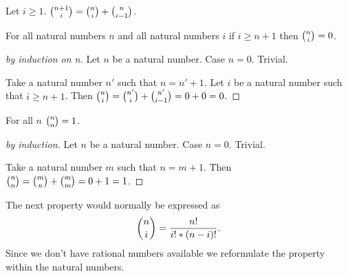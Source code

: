 \documentclass[11pt]{article}
\begin{document}
\begin{forthel}
\begin{axiom} Let $i \geq 1$.
${n+1 \choose i} = {n \choose i} + {n \choose i-1}$.
\end{axiom}

\begin{theorem} For all natural numbers $n$ and 
all natural numbers $i$
if $i \geq n + 1$ then ${n \choose i} = 0$.
\end{theorem}
\begin{proof}[by induction on n]
Let $n$ be a natural number.
Case $n = 0$. Trivial.

Take a natural number $n'$ such that $n = n' + 1$.
Let $i$ be a natural number such that $i \geq n + 1$.
Then ${n \choose i} = {n' \choose i} + {n' \choose i-1} = 0 + 0 = 0$.
\end{proof}


\begin{theorem} For all $n$
${n \choose n} = 1$.
\end{theorem}
\begin{proof}[by induction]
Let $n$ be a natural number.
Case $n = 0$. Trivial.

Take a natural number $m$ such that $n = m + 1$.
Then ${n \choose n} = {m \choose n} + {m \choose m} = 0 + 1 = 1$.

\end{proof}
\end{forthel}
%
The next property would normally be expressed as
%
$${n \choose i} = \frac{n !}{i ! * (n-i) !}.$$
%
Since we don't have rational numbers available we
reformulate the property within the natural numbers.
%
\end{document}
